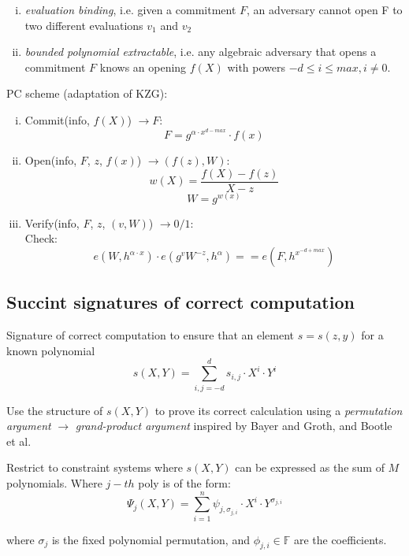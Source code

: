 \documentclass{article}
\theoremstyle{definition}
\begin{document}
\begin{enumerate}[i.]
    \item \emph{evaluation binding}, i.e. given a commitment $F$, an adversary cannot open F to two different evaluations $v_1$ and $v_2$
    \item \emph{bounded polynomial extractable}, i.e. any algebraic adversary that opens a commitment $F$ knows an opening $f(X)$ with powers $-d \leq i \leq max, i \neq 0$.
\end{enumerate}

\vspace{0.5cm}
PC scheme (adaptation of KZG):

\begin{enumerate}[i.]
    \item Commit(info, $f(X)$) $\longrightarrow F$:
	$$F = g^{\alpha \cdot x^{d-max}} \cdot f(x)$$
    \item Open(info, $F$, $z$, $f(x)$) $\longrightarrow (f(z), W)$:
	$$w(X) = \frac{f(X) - f(z)}{X-z}$$
	$$W = g^{w(x)}$$
    \item Verify(info, $F$, $z$, $(v, W)$) $\longrightarrow 0/1$:\\
	Check:
	$$e(W, h^{\alpha \cdot x}) \cdot
	e(g^v W^{-z}, h^{\alpha})
	== e(F, h^{x^{-d+max}})$$
\end{enumerate}

\subsection{Succint signatures of correct computation}
Signature of correct computation to ensure that an element $s=s(z, y)$ for a known polynomial
$$s(X, Y) = \sum_{i, j = -d}^d s_{i, j} \cdot X^i \cdot Y^i$$

Use the structure of $s(X, Y)$ to prove its correct calculation using a \emph{permutation argument} $\longrightarrow$ \emph{grand-product argument} inspired by Bayer and Groth, and Bootle et al.

Restrict to constraint systems where $s(X, Y)$ can be expressed as the sum of $M$ polynomials. Where $j-th$ poly is of the form:
$$
\Psi_j(X, Y) =
    \sum_{i=1}^n \psi_{j, \sigma_{j, i}}
    \cdot X^i \cdot Y^{\sigma_{j, i}}
$$

where $\sigma_j$ is the fixed polynomial permutation, and $\phi_{j, i} \in \mathbb{F}$ are the coefficients.

\vspace{1cm}
\vspace{1cm}
\end{document}
